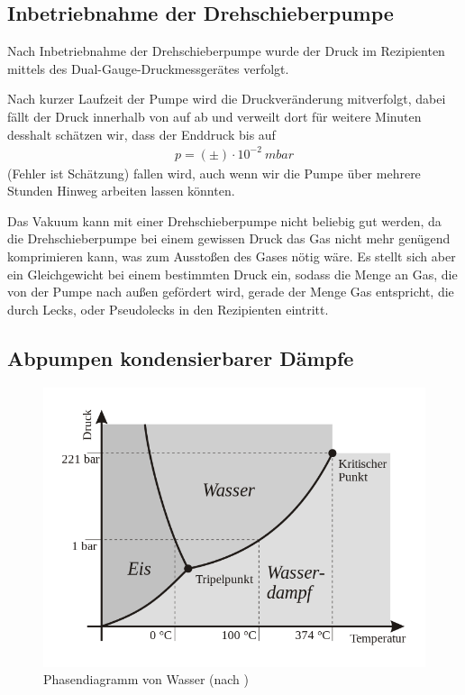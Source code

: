 \documentclass[12pt, a4paper]{scrartcl}
\begin{document}
	\subsection{Inbetriebnahme der Drehschieberpumpe}
	
		Nach Inbetriebnahme der Drehschieberpumpe wurde der Druck im Rezipienten mittels des Dual-Gauge-Druckmessgerätes verfolgt.
		
		Nach kurzer Laufzeit der Pumpe wird die Druckveränderung mitverfolgt, dabei fällt der Druck innerhalb von 
        auf 
        ab und verweilt dort für 
        weitere Minuten
		desshalt schätzen wir, dass der Enddruck bis auf
		\begin{align*}
			p=(\pm)\cdot 10^{-2}\ mbar
		\end{align*}
		(Fehler ist Schätzung) fallen wird, auch wenn wir die Pumpe über mehrere Stunden Hinweg arbeiten lassen könnten.
		
		Das Vakuum kann mit einer Drehschieberpumpe nicht beliebig gut werden, da die Drehschieberpumpe bei einem gewissen Druck das Gas nicht mehr genügend komprimieren kann, was zum Ausstoßen des Gases nötig wäre.
		Es stellt sich aber ein Gleichgewicht bei einem bestimmten Druck ein, sodass die Menge an Gas, die von der Pumpe nach außen gefördert wird, gerade der Menge Gas entspricht, die durch Lecks, oder Pseudolecks in den Rezipienten eintritt.
		
		
	\subsection{Abpumpen kondensierbarer Dämpfe}
		
		\begin{figure}[H]
			\centering
			\includegraphics[width=.5\paperwidth]{phasen-wasser}
			\caption{Phasendiagramm von Wasser (nach \cite{wikibooks})}
		\end{figure}
    
\end{document}
